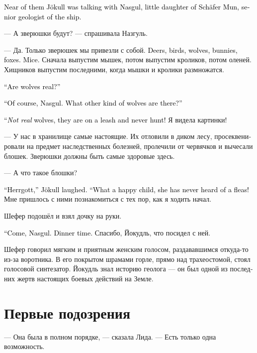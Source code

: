 \documentclass[a4paper,12pt,fleqn]{book}\usepackage{cooltooltips}\usepackage{polyglossia}\setdefaultlanguage[babelshorthands=true]{russian}\setotherlanguage{english}\defaultfontfeatures{Ligatures=TeX,Mapping=tex-text} \usepackage{xcolor}\definecolor{lightgray}{HTML}{bbbbbb}\color{lightgray}\newcommand{\ml}[3]{\textenglish{\textcolor{black}{#3}}}
\begin{document}
\ml{$0$}
{Неподалёку Йокудль разговаривал с Назгуль, маленькой дочкой Шефера Муна --- старшего геолога корабля.}
{Near of them Jökull was talking with Nasgul, little daughter of Schäfer Mun, senior geologist of the ship.}

--- А зверюшки будут? --- спрашивала Назгуль.

--- Да.
Только зверюшек мы привезли с собой.
\ml{$0$}
{Олени, птички, волки, кролики, лисы.}
{Deers, birds, wolves, bunnies, foxes.}
\ml{$0$}
{Мышки.}
{Mice.}
Сначала выпустим мышек, потом выпустим кроликов, потом оленей.
Хищников выпустим последними, когда мышки и кролики размножатся.

\ml{$0$}
{--- А волки настоящие?}
{``Are wolves real?''}

\ml{$0$}
{--- Конечно, Назгуль.}
{``Of course, Nasgul.}
\ml{$0$}
{А какие ещё бывают волки?}
{What other kind of wolves are there?''}

\ml{$0$}
{--- Бывают ненастоящие, которые на поводке сидят и не охотятся!}
{``\emph{Not real} wolves, they are on a leash and never hunt!}
Я видела картинки!

--- У нас в хранилище самые настоящие.
Их отловили в диком лесу, просеквенировали на предмет наследственных болезней, пролечили от червячков и вычесали блошек.
Зверюшки должны быть самые здоровые здесь.

--- А что такое блошки?

\ml{$0$}
{--- Господь, --- Йокудль засмеялся.}
{``Herrgott,'' Jökull laughed.}
\ml{$0$}
{--- Счастливое дитя, не знает, что такое блошки!}
{``What a happy child, she has never heard of a fleas!}
Мне пришлось с ними познакомиться с тех пор, как я ходить начал.

Шефер подошёл и взял дочку на руки.

\ml{$0$}
{--- Пойдём, Назгуль.}
{``Come, Nasgul.}
\ml{$0$}
{Время обеда.}
{Dinner time.}
Спасибо, Йокудль, что посидел с ней.

Шефер говорил мягким и приятным женским голосом, раздававшимся откуда-то из-за воротника.
В его покрытом шрамами горле, прямо над трахеостомой, стоял голосовой синтезатор.
Йокудль знал историю геолога --- он был одной из последних жертв настоящих боевых действий на Земле.

\section{Первые подозрения}

--- Она была в полном порядке, --- сказала Лида.
--- Есть только одна возможность.
\end{document}
